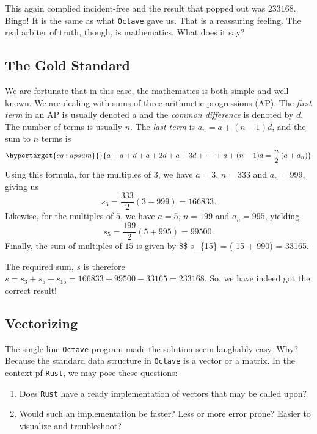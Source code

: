 \documentclass[
  a4paper,
]{article}
\begin{document}
This again complied incident-free and the result that popped out was
\(233168\). Bingo! It is the same as what \texttt{Octave} gave us. That
is a reassuring feeling. The real arbiter of truth, though, is
mathematics. What does it say?

\hypertarget{the-gold-standard}{%
\subsection{The Gold Standard}\label{the-gold-standard}}

We are fortunate that in this case, the mathematics is both simple and
well known. We are dealing with sums of three
\href{https://en.wikipedia.org/wiki/Arithmetic_progression\#Sum}{arithmetic
progressions (AP)}. The \emph{first term} in an AP is usually denoted
\(a\) and the \emph{common difference} is denoted by \(d\). The number
of terms is usually \(n\). The \emph{last term} is
\(a_n = a + (n - 1)d\), and the sum to \(n\) terms is
\begin{equation}\protect\hypertarget{eq:apsum}{}{
a + a + d + a + 2d + a + 3d + \cdots + a + (n - 1)d = \frac{n}{2}\left( a + a_n \right)
}\label{eq:apsum}\end{equation} Using this formula, for the multiples of
\(3\), we have \(a = 3\), \(n = 333\) and \(a_n=999\), giving us \[
s_3 = \frac{333}{2}\left( 3 + 999\right) = 166833.
\] Likewise, for the multiples of \(5\), we have \(a = 5\), \(n = 199\)
and \(a_n = 995\), yielding \[
s_5 = \frac{199}{2}\left( 5 + 995\right) = 99500.
\] Finally, the sum of multiples of \(15\) is given by \$\$ s\_\{15\} =
\left( 15 + 990\right) = 33165.

The required sum, \(s\) is therefore
\(s= s_3 + s_5 - s_{15} = 166833 + 99500 -33165 = 233168.\) So, we have
indeed got the correct result!

\hypertarget{vectorizing}{%
\subsection{Vectorizing}\label{vectorizing}}

The single-line \texttt{Octave} program made the solution seem laughably
easy. Why? Because the standard data structure in \texttt{Octave} is a
vector or a matrix. In the context pf \texttt{Rust}, we may pose these
questions:

\begin{enumerate}
\item
  Does \texttt{Rust} have a ready implementation of vectors that may be
  called upon?
\item
  Would such an implementation be faster? Less or more error prone?
  Easier to visualize and troubleshoot?
\end{enumerate}
\end{document}
